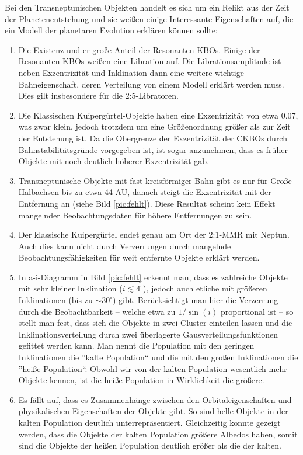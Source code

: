 \documentclass[10pt,a4paper,twoside]{article}
\begin{document}
Bei den Transneptunischen Objekten handelt es sich um ein Relikt aus der Zeit der Planetenentstehung und sie weißen einige Interessante Eigenschaften auf, die ein Modell der planetaren Evolution erklären können sollte: %
\begin{enumerate}
\item Die Existenz und er große Anteil der Resonanten KBOs. Einige der Resonanten KBOs weißen eine Libration auf. Die Librationsamplitude ist neben Exzentrizität und Inklination dann eine weitere wichtige Bahneigenschaft, deren Verteilung von einem Modell erklärt werden muss\cite{Levison2008}. Dies gilt insbesondere für die 2:5-Libratoren. %
\item Die Klassischen Kuipergürtel-Objekte haben eine Exzentrizität von etwa 0.07, was zwar klein, jedoch trotzdem um eine Größenordnung größer als zur Zeit der Entstehung ist. Da die Obergrenze der Exzentrizität der CKBOs durch Bahnstabilitätsgründe vorgegeben ist, ist sogar anzunehmen, dass es früher Objekte mit noch deutlich höherer Exzentrizität gab.
\item Transneptunische Objekte mit fast kreisförmiger Bahn gibt es nur für Große Halbachsen bis zu etwa 44 AU, danach steigt die Exzentrizität mit der Entfernung an (siehe Bild \ref{pic:fehlt})\cite{Levison2008}. Diese Resultat scheint kein Effekt mangelnder Beobachtungsdaten für höhere Entfernungen zu sein.\cite{Levison2008}
\item Der klassische Kuipergürtel endet genau am Ort der 2:1-MMR mit Neptun\cite{Levison2008}. Auch dies kann nicht durch Verzerrungen durch mangelnde Beobachtungsfähigkeiten für weit entfernte Objekte erklärt werden.
\item In a-i-Diagramm in Bild \ref{pic:fehlt} erkennt man, dass es zahlreiche Objekte mit sehr kleiner Inklination ($i\lesssim 4^\circ$), jedoch auch etliche mit größeren Inklinationen (bis zu $\sim 30^\circ$) gibt. Berücksichtigt man hier die Verzerrung durch die Beobachtbarkeit -- welche etwa zu $1/\sin(i)$ proportional ist -- so stellt man fest, dass sich die Objekte in zwei Cluster einteilen lassen und die Inklinationsverteilung durch zwei überlagerte Gausverteilungsfunktionen gefittet werden kann. %
Man nennt die Population mit den geringen Inklinationen die ''kalte Population`` und die mit den großen Inklinationen die ''heiße Population``. Obwohl wir von der kalten Population wesentlich mehr Objekte kennen, ist die heiße Population in Wirklichkeit die größere.\cite{Levison2008}
\item Es fällt auf, dass es Zusammenhänge zwischen den Orbitaleigenschaften und physikalischen Eigenschaften der Objekte gibt. So  sind helle Objekte in der kalten Population deutlich unterrepräsentiert. Gleichzeitig konnte gezeigt werden, dass die Objekte der kalten Population größere Albedos haben, somit sind die Objekte der heißen Population deutlich größer als die der kalten. %

\end{enumerate}
\end{document}
